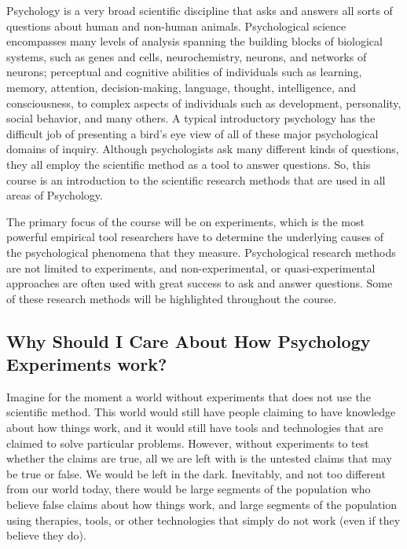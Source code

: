 \documentclass[]{book}
\theoremstyle{definition}
\theoremstyle{definition}
\theoremstyle{remark}
\begin{document}
Psychology is a very broad scientific discipline that asks and answers
all sorts of questions about human and non-human animals. Psychological
science encompasses many levels of analysis spanning the building blocks
of biological systems, such as genes and cells, neurochemistry, neurons,
and networks of neurons; perceptual and cognitive abilities of
individuals such as learning, memory, attention, decision-making,
language, thought, intelligence, and consciousness, to complex aspects
of individuals such as development, personality, social behavior, and
many others. A typical introductory psychology has the difficult job of
presenting a bird's eye view of all of these major psychological domains
of inquiry. Although psychologists ask many different kinds of
questions, they all employ the scientific method as a tool to answer
questions. So, this course is an introduction to the scientific research
methods that are used in all areas of Psychology.

The primary focus of the course will be on experiments, which is the
most powerful empirical tool researchers have to determine the
underlying causes of the psychological phenomena that they measure.
Psychological research methods are not limited to experiments, and
non-experimental, or quasi-experimental approaches are often used with
great success to ask and answer questions. Some of these research
methods will be highlighted throughout the course.

\subsection{Why Should I Care About How Psychology Experiments
work?}\label{why-should-i-care-about-how-psychology-experiments-work}

Imagine for the moment a world without experiments that does not use the
scientific method. This world would still have people claiming to have
knowledge about how things work, and it would still have tools and
technologies that are claimed to solve particular problems. However,
without experiments to test whether the claims are true, all we are left
with is the untested claims that may be true or false. We would be left
in the dark. Inevitably, and not too different from our world today,
there would be large segments of the population who believe false claims
about how things work, and large segments of the population using
therapies, tools, or other technologies that simply do not work (even if
they believe they do).
\end{document}
